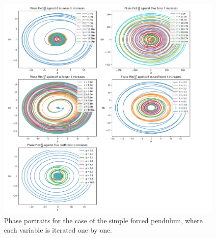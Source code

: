 \documentclass[10pt, twocolumn]{article}
\begin{document}
\begin{figure}
    \centering
    \includegraphics[width = 1.2\columnwidth]{Projects/ForcedSimplePendulum/Plots/test_plots_phase.png}
    \caption{Phase portraits for the case of the simple forced pendulum, where each variable is iterated one by one.}
    \label{phase portrait test}
\end{figure}

\twocolumn
\end{document}
